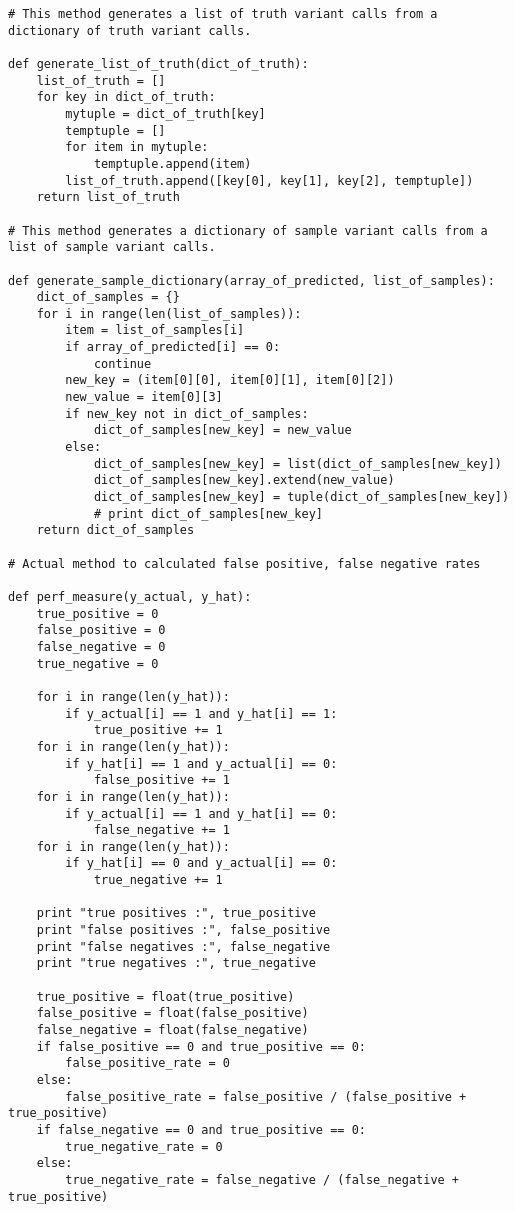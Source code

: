\documentclass{article}
\begin{document}
\begin{verbatim}
# This method generates a list of truth variant calls from a dictionary of truth variant calls.

def generate_list_of_truth(dict_of_truth):
    list_of_truth = []
    for key in dict_of_truth:
        mytuple = dict_of_truth[key]
        temptuple = []
        for item in mytuple:
            temptuple.append(item)
        list_of_truth.append([key[0], key[1], key[2], temptuple])
    return list_of_truth

# This method generates a dictionary of sample variant calls from a list of sample variant calls.
	
def generate_sample_dictionary(array_of_predicted, list_of_samples):
    dict_of_samples = {}
    for i in range(len(list_of_samples)):
        item = list_of_samples[i]
        if array_of_predicted[i] == 0:
            continue
        new_key = (item[0][0], item[0][1], item[0][2])
        new_value = item[0][3]
        if new_key not in dict_of_samples:
            dict_of_samples[new_key] = new_value
        else:
            dict_of_samples[new_key] = list(dict_of_samples[new_key])
            dict_of_samples[new_key].extend(new_value)
            dict_of_samples[new_key] = tuple(dict_of_samples[new_key])
            # print dict_of_samples[new_key]
    return dict_of_samples

# Actual method to calculated false positive, false negative rates
	
def perf_measure(y_actual, y_hat):
    true_positive = 0
    false_positive = 0
    false_negative = 0
    true_negative = 0

    for i in range(len(y_hat)):
        if y_actual[i] == 1 and y_hat[i] == 1:
            true_positive += 1
    for i in range(len(y_hat)):
        if y_hat[i] == 1 and y_actual[i] == 0:
            false_positive += 1
    for i in range(len(y_hat)):
        if y_actual[i] == 1 and y_hat[i] == 0:
            false_negative += 1
    for i in range(len(y_hat)):
        if y_hat[i] == 0 and y_actual[i] == 0:
            true_negative += 1

    print "true positives :", true_positive
    print "false positives :", false_positive
    print "false negatives :", false_negative
    print "true negatives :", true_negative

    true_positive = float(true_positive)
    false_positive = float(false_positive)
    false_negative = float(false_negative)
    if false_positive == 0 and true_positive == 0:
        false_positive_rate = 0
    else:
        false_positive_rate = false_positive / (false_positive + true_positive)
    if false_negative == 0 and true_positive == 0:
        true_negative_rate = 0
    else:
        true_negative_rate = false_negative / (false_negative + true_positive)


\end{verbatim}
\end{document}
